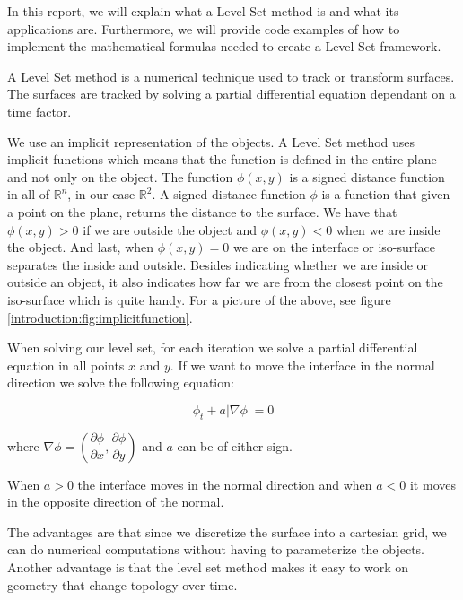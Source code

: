 In this report, we will explain what a Level Set method is and what its applications are. Furthermore, we will provide code examples of how to implement the mathematical formulas needed to create a Level Set framework. 

A Level Set method is a numerical technique used to track or transform surfaces. The surfaces are tracked by solving a partial differential equation dependant on a time factor. 

We use an implicit representation of the objects. A Level Set method uses implicit functions which means that the function is defined in the entire plane and not only on the object. The function $\phi(x,y)$ is a signed distance function in all of $\mathbb{R}^{n}$, in our case $\mathbb{R}^{2}$. A signed distance function $\phi$ is a function that given a point on the plane, returns the distance to the surface. We have that $\phi(x,y) > 0$ if we are outside the object and $\phi(x,y) < 0$ when we are inside the object. And last, when $\phi(x,y) = 0$ we are on the interface or iso-surface separates the inside and outside. Besides indicating whether we are inside or outside an object, it also indicates how far we are from the closest point on the iso-surface which is quite handy. For a picture of the above, see figure \ref{introduction:fig:implicitfunction}.



When solving our level set, for each iteration we solve a partial differential equation in all points $x$ and $y$. If we want to move the interface in the normal direction we solve the following equation:

\begin{equation}
\label{introduction:eq:levelsetndirection}
  \phi_{t} + a|\nabla \phi| = 0
\end{equation}

where $\nabla \phi = (\dfrac{\partial \phi}{\partial x}, \dfrac{\partial \phi}{\partial y})$  and $a$ can be of either sign. 

When $a > 0$ the interface moves in the normal direction and when $a < 0$ it moves in the opposite direction of the normal.

The advantages are that since we discretize the surface into a cartesian grid, we can do numerical computations without having to parameterize the objects. Another advantage is that the level set method makes it easy to work on geometry that change topology over time.


